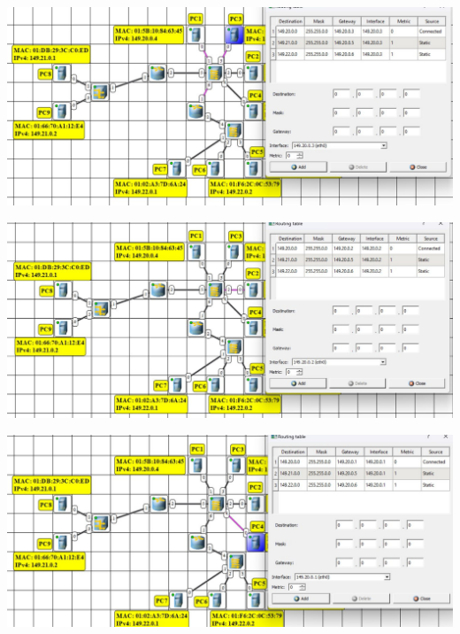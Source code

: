 \documentclass{article}
\begin{document}
\begin{center}
    \includegraphics[width=.9\textwidth]{2-5}
\end{center}
\begin{center}
    \includegraphics[width=.9\textwidth]{2-6}
\end{center}
\begin{center}
    \includegraphics[width=.9\textwidth]{2-7}
\end{center}
\end{document}
